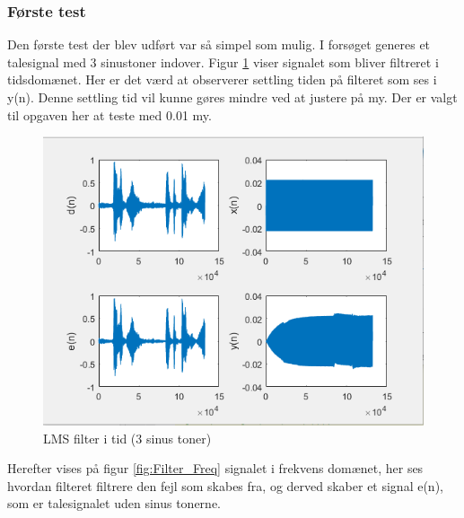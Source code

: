 \subsubsection{Første test}
Den første test der blev udført var så simpel som mulig. I forsøget generes et talesignal med 3 sinustoner indover. 
Figur \ref{fig:Filter_time} viser signalet som bliver filtreret i tidsdomænet. Her er det værd at observerer settling tiden på filteret som ses i y(n). Denne settling tid vil kunne gøres mindre ved at justere på my. Der er valgt til opgaven her at teste med 0.01 my. 
\begin{figure}[H]
	\centering
	\includegraphics[width = 400pt]{Img/Filter_time}
	\caption{LMS filter i tid (3 sinus toner)}
	\label{fig:Filter_time}
\end{figure}
\newpage
Herefter vises på figur \ref{fig:Filter_Freq} signalet i frekvens domænet, her ses hvordan filteret filtrere den fejl som skabes fra, og derved skaber et signal e(n), som er talesignalet uden sinus tonerne. 

